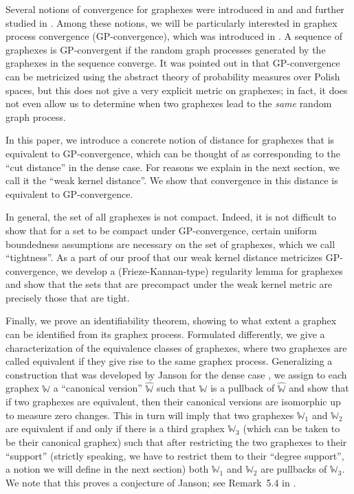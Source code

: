 \documentclass{amsart}
\numberwithin{equation}{section}
\numberwithin{figure}{section}
\theoremstyle{definition}
\theoremstyle{remark}
\newcommand{\cW}{\mathbb{W}}
\begin{document}
Several notions of convergence for graphexes were introduced in \cite{BCCH16}
and \cite{VR16} and further studied in \cite{JANSON17}. Among these notions,
we will be particularly interested in graphex process convergence
(GP-convergence), which was introduced in \cite{VR16}. A sequence of
graphexes is GP-convergent if the random graph processes generated by the
graphexes in the sequence converge. It was pointed out in \cite{JANSON17}
that GP-convergence can be metricized using the abstract theory of
probability measures over Polish spaces, but this does not give a very
explicit metric on graphexes; in fact, it does not even allow us to determine
when two graphexes lead to the \emph{same} random graph process.

In this paper, we introduce a concrete notion of distance for graphexes that
is equivalent to GP-convergence, which can be thought of as corresponding to
the ``cut distance'' in the dense case. For reasons we explain in the next
section, we call it the ``weak kernel distance''. We show that convergence in
this distance is equivalent to GP-convergence.

In general, the set of all graphexes is not compact. Indeed, it is not
difficult to show that for a set to be compact under GP-convergence, certain
uniform boundedness assumptions are necessary on the set of graphexes, which
we call ``tightness''. As a part of our proof that our weak kernel distance
metricizes GP-convergence, we develop a (Frieze-Kannan-type) regularity lemma
for graphexes and show that the sets that are precompact under the weak
kernel metric are precisely those that are tight.

Finally, we prove an identifiability theorem, showing to what extent a
graphex can be identified from its graphex process. Formulated differently,
we give a characterization of the equivalence classes of graphexes, where two
graphexes are called equivalent if they give rise to the same graphex
process. Generalizing a construction that was developed by Janson for the
dense case \cite{JANSON13}, we assign to each graphex $\cW$ a ``canonical
version'' $\widehat{\cW}$ such that $\cW$ is a pullback of $\widehat{\cW}$
and show that if two graphexes are equivalent, then their canonical versions
are isomorphic up to measure zero changes. This in turn will imply that two
graphexes $\cW_1$ and $\cW_2$ are equivalent if and only if there is a third
graphex $\cW_3$ (which can be taken to be their canonical graphex) such that
after restricting the two graphexes to their ``support'' (strictly speaking,
we have to restrict them to their ``degree support'', a notion we will define
in the next section) both $\cW_1$ and $\cW_2$ are pullbacks of $\cW_3$. We
note that this proves a conjecture of Janson; see Remark~5.4 in
\cite{JANSON16}.
\end{document}
